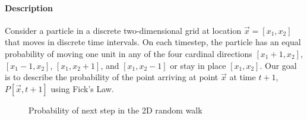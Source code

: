 

\paragraph{Description}
Consider a particle in a discrete two-dimensional grid at location $\vec{x}=[x_1,x_2]$ that moves in discrete time intervals. On each timestep, the particle has an equal probability of moving one unit in any of the four cardinal directions $[x_1+1,x_2]$, $[x_1-1,x_2]$, $[x_1,x_2+1]$, and $[x_1,x_2-1]$ or stay in place $[x_1,x_2]$. Our goal is to describe the probability of the point arriving at point $\vec{x}$ at time $t+1$, $P[\vec{x},t+1]$ using Fick's Law.

\begin{figure}[htb]
\centering
{}
\caption{Probability of next step in the 2D random walk}\label{2DrandomWalkProbs.fig}
\end{figure}
    
